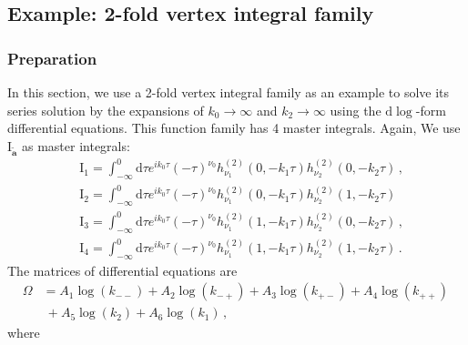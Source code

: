 \documentclass[a4paper,11pt]{article}
\newcommand{\nn}{\nonumber}
\newcommand{\nd}{\mathrm{d}}
\begin{document}
\subsection{Example: 2-fold vertex integral family} \label{sec:1-v_2f}
\subsubsection{Preparation}

In this section, we use a 2-fold vertex integral family as an example to solve its series solution by the expansions of \( k_0 \to \infty \) and \( k_2 \to \infty \) using the $\nd \log$-form differential equations. This function family has 4 master integrals. Again, We use $\text{I}_{\tilde{\bm{a}}}$ as master integrals:
\begin{align}
&\text{I}_{1}=\int_{-\infty}^0 \nd \tau e^{ i k_0 \tau} (-\tau)^{\nu_0} h^{(2)}_{\nu_1}(0,-k_1\tau)h^{(2)}_{\nu_2}(0,-k_2\tau) \,,\nn\\ 
&\text{I}_{2}=\int_{-\infty}^0 \nd \tau e^{ i k_0 \tau} (-\tau)^{\nu_0} h^{(2)}_{\nu_1}(0,-k_1\tau) h^{(2)}_{\nu_2}(1,-k_2\tau)\,\nn\\
&\text{I}_{3}=\int_{-\infty}^0 \nd \tau e^{ i k_0 \tau} (-\tau)^{\nu_0} h^{(2)}_{\nu_1}(1,-k_1\tau)h^{(2)}_{\nu_2}(0,-k_2\tau) \,,\nn\\ 
&\text{I}_{4}=\int_{-\infty}^0 \nd \tau e^{ i k_0 \tau} (-\tau)^{\nu_0} h^{(2)}_{\nu_1}(1,-k_1\tau)h^{(2)}_{\nu_2}(1,-k_2\tau) \,.
\end{align}
The matrices of differential equations are
\begin{align}
\Omega&=A_1 \log \left(k_{--}\right)+A_2 \log \left(k_{-+}\right)+A_3 \log \left(k_{+-}\right)+A_4
   \log \left(k_{++}\right) \, \nn\\
   &~+A_5 \log \left(k_2\right)+A_6 \log \left(k_1\right) \,,
\end{align}
where
\end{document}

